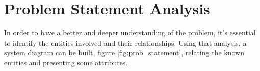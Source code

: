 \documentclass[12pt, letterpaper]{report}
\begin{document}
\section{Problem Statement Analysis}
In order to have a better and deeper understanding of the problem, it’s essential to identify the entities involved and their relationships. Using that analysis, a system diagram can be built, figure \ref{fig:prob_statement}, relating the known entities and presenting some attributes.







\end{document}
